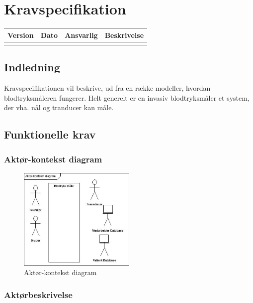 \chapter{Kravspecifikation}

\begin{longtabu} to 
    Version &    Dato &    Ansvarlig &    Beskrivelse\\[-1ex]
    \midrule
\label{version_Systemark}
\end{longtabu}


\section{Indledning}
Kravspecifikationen vil beskrive, ud fra en række modeller, hvordan blodtryksmåleren fungerer. Helt generelt er en invasiv blodtryksmåler et system, der vha. nål og tranducer kan måle.


\section{Funktionelle krav}
\subsection{Aktør-kontekst diagram}

\begin{figure}[H]
	\centering
	\includegraphics[width=0.5\textwidth]{Figurer/ISE/aktdiagram}
	\caption{Aktør-kontekst diagram}
\end{figure}


\subsection{Aktørbeskrivelse}

